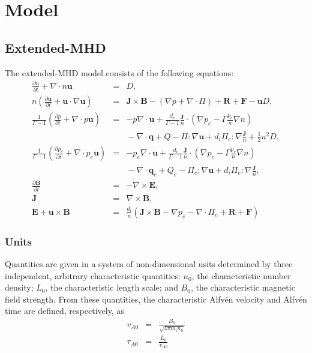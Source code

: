 \documentclass[letterpaper]{book}
\newcommand{\ddt}[1]{\frac{\partial #1}{\partial t}}
\renewcommand{\vec}[1]{\ensuremath{\mathbf{#1}}}
\newcommand{\tensor}[1]{\mathsf{#1}}
\newcommand{\B}{\vec{B}}
\newcommand{\E}{\vec{E}}
\newcommand{\R}{\vec{R}}
\renewcommand{\u}{\vec{u}}
\newcommand{\F}{\vec{F}}
\renewcommand{\j}{\vec{J}}
\newcommand{\q}{\vec{q}}
\newcommand{\jn}{\frac{\j}{n}}
\renewcommand{\P}{\tensor{\Pi}}
\renewcommand{\div}[1]{\nabla \cdot #1}
\newcommand{\curl}[1]{\nabla \times #1}
\newcommand{\dotdot}{:}
\begin{document}
\chapter{Model}

\section{Extended-MHD}

The extended-MHD model consists of the following equations:
\begin{subequations} \label{eq:xmhd}
\begin{eqnarray}
  \label{eq:continuity}
  \ddt{n} + \div n \u & = & D,
  \\
  \label{eq:momentum}
  n \left( \ddt{\u} + \u \cdot \nabla \u \right) 
  & = & \j \times \B - (\nabla p + \div \P) + \R + \F - \u D,
  \\
  \frac{1}{\Gamma-1} \left( \ddt{p} + \div{p\u} \right)
  & = & -p \div\u +
  \frac{d_i}{\Gamma-1}\jn\cdot\left(\nabla p_e -
  \Gamma \frac{p_e}{n}\nabla n \right)
  \\ & & \mbox{}
  - \div{\q} + Q - \P\dotdot\nabla \u + d_i \P_e\dotdot\nabla \jn + \frac{1}{2} u^2 D,
  \nonumber \\
  \frac{1}{\Gamma-1} \left( \ddt{p_e} + \div{p_e\u} \right)
  & = & -p_e \div\u +
  \frac{d_i}{\Gamma-1}\jn\cdot\left(\nabla p_e -
  \Gamma \frac{p_e}{n}\nabla n \right)
  \\ & & \mbox{} 
  - \div{\q_e} + Q_e - \P_e\dotdot\nabla \u + d_i \P_e\dotdot\nabla \jn,
  \nonumber 
  \\
  \label{eq:Faraday}
  \ddt{\B} & = & -\curl \E,
  \\
  \j & = &\curl \B,
  \\
  \label{eq:ohm}
  \E + \u \times \B & = &  
  \frac{d_i}{n} \left(\j\times\B - \nabla p_e 
  - \div{\P_e} + \R + \F \right)
\end{eqnarray}
\end{subequations}

\subsection{Units}

Quantities are given in a system of non-dimensional usits determined
by three independent, arbitrary characteristic quantities: $n_0$, the
characteristic number density; $L_0$, the characteristic length scale;
and $B_0$, the characteristic magnetic field strength.  From these
quantities, the characteristic Alfv\'en velocity and Alfv\'en time are
defined, respectively, as
\begin{eqnarray}
  v_{A 0} & = & \frac{B_0}{\sqrt{4\pi m_i n_0}}\\
  \tau_{A 0} & = & \frac{L_0}{v_{A 0}}
\end{eqnarray}
\end{document}
